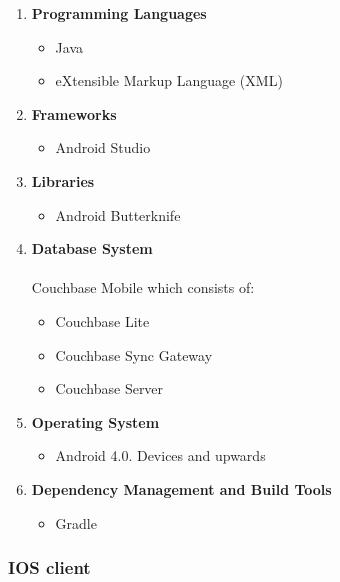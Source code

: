 \documentclass{article}
\begin{document}
			\begin{enumerate}
				 \item \textbf{Programming Languages}
				\begin{itemize}
					\item Java
					\item eXtensible Markup Language (XML)
				\end{itemize}
			\item \textbf{Frameworks}
				\begin{itemize}
					\item Android Studio
				\end{itemize}
			\item \textbf{Libraries}
				\begin{itemize}
					\item Android Butterknife
				\end{itemize}
			\item \textbf{Database System} \\ \\ 
			Couchbase Mobile which consists of:
				\begin{itemize}
	 				\item Couchbase Lite
					\item Couchbase Sync Gateway
					\item Couchbase Server
				\end{itemize}
				\item \textbf{Operating System}
			\begin{itemize}
	 				\item Android 4.0. Devices and upwards
				\end{itemize}
			\item \textbf{Dependency Management and Build Tools}
				\begin{itemize}
					\item Gradle
				\end{itemize}
			\end{enumerate}
	
		\subsubsection{IOS client}
		
\end{document}
